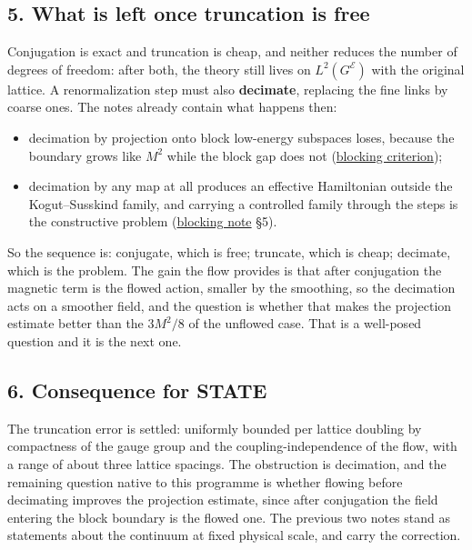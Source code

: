 \documentclass[11pt,a4paper]{article}
\newcommand{\tightlist}{\setlength{\itemsep}{0pt}\setlength{\parskip}{0pt}}
\begin{document}
\hypertarget{what-is-left-once-truncation-is-free}{%
\subsection{5. What is left once truncation is
free}\label{what-is-left-once-truncation-is-free}}

Conjugation is exact and truncation is cheap, and neither reduces the
number of degrees of freedom: after both, the theory still lives on
\(L^2(G^{\mathcal E})\) with the original lattice. A renormalization
step must also \textbf{decimate}, replacing the fine links by coarse
ones. The notes already contain what happens then:

\begin{itemize}
\tightlist
\item
  decimation by projection onto block low-energy subspaces loses,
  because the boundary grows like \(M^2\) while the block gap does not
  (\href{blocking-criterion-monotone.md}{blocking criterion});
\item
  decimation by any map at all produces an effective Hamiltonian outside
  the Kogut--Susskind family, and carrying a controlled family through
  the steps is the constructive problem
  (\href{blocking-step-obstruction.md}{blocking note} §5).
\end{itemize}

So the sequence is: conjugate, which is free; truncate, which is cheap;
decimate, which is the problem. The gain the flow provides is that after
conjugation the magnetic term is the flowed action, smaller by the
smoothing, so the decimation acts on a smoother field, and the question
is whether that makes the projection estimate better than the \(3M^2/8\)
of the unflowed case. That is a well-posed question and it is the next
one.

\hypertarget{consequence-for-state}{%
\subsection{6. Consequence for STATE}\label{consequence-for-state}}

The truncation error is settled: uniformly bounded per lattice doubling
by compactness of the gauge group and the coupling-independence of the
flow, with a range of about three lattice spacings. The obstruction is
decimation, and the remaining question native to this programme is
whether flowing before decimating improves the projection estimate,
since after conjugation the field entering the block boundary is the
flowed one. The previous two notes stand as statements about the
continuum at fixed physical scale, and carry the correction.
\end{document}
